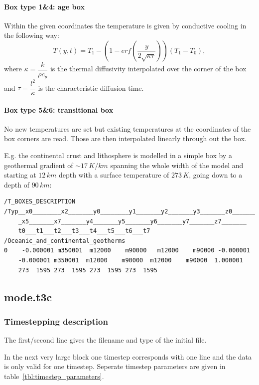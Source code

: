 \begin{table}[H]
\paragraph{Box type 1\&4: age box}
Within the given coordinates the temperature is given by conductive cooling in the following way:
\begin{equation}\label{eqs:cond_cooling}
T(y,t)=T_1-(1-erf(\dfrac{y}{2\sqrt{\kappa\tau}}))(T_1-T_0),
\end{equation}
where $\kappa=\dfrac{k}{\rho c_p}$ is the thermal diffusivity interpolated over the corner of the box and $\tau=\dfrac{l^2}{\kappa}$ is the characteristic diffusion time.

\paragraph{Box type 5\&6: transitional box}
No new temperatures are set but existing temperatures at the coordinates of the box corners are read. Those are then interpolated linearly through out the box.

E.g. the continental crust and lithosphere is modelled in a simple box by a geothermal gradient of $\sim17\,K/km$ spanning the whole width of the model and starting at $12\,km$ depth with a surface temperature of $273\,K$, going down to a depth of $90\,km$:
\lstset{basicstyle=\small}
\begin{lstlisting}
/T_BOXES_DESCRIPTION
/Typ__x0________x2_______y0________y1_______y2_______y3_______z0_______
	_x5_______x7_______y4_______y5_______y6_______y7_______z7_______
	t0___t1___t2___t3___t4___t5___t6___t7
/Oceanic_and_continental_geotherms
0    -0.000001 m350001  m12000    m90000   m12000    m90000 -0.000001
	-0.000001 m350001  m12000    m90000  m12000    m90000  1.000001
	273  1595 273  1595 273  1595 273  1595
\end{lstlisting}

\subsection{mode.t3c}

\subsubsection{Timestepping description}

The first/second line gives the filename and type of the initial file.

In the next very large block one timestep corresponds with one line and the data is only valid for one timestep. Seperate timestep parameters are given in table~\ref{tbl:timestep_parameters}.


\end{table}

